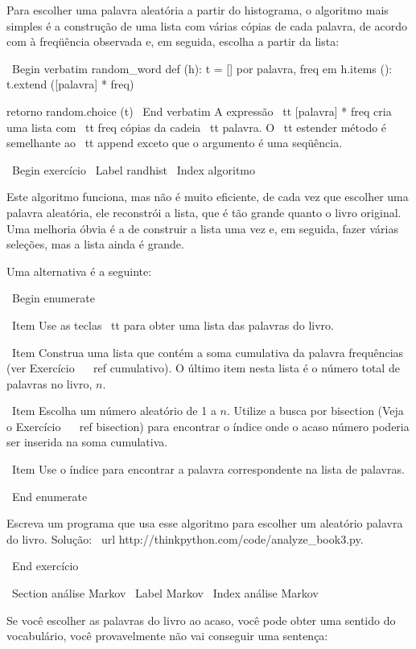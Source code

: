 \documentclass[10pt]{book}
\begin{document}
{{{{{{{{{Para escolher uma palavra aleatória a partir do histograma, o algoritmo mais simples
é a construção de uma lista com várias cópias de cada palavra, de acordo com
à freqüência observada e, em seguida, escolha a partir da lista:

\ Begin {verbatim}
random_word def (h):
    t = []
    por palavra, freq em h.items ():
        t.extend ([palavra] * freq)

    retorno random.choice (t)
\ End {verbatim}
%
A expressão {\ tt [palavra] * freq} cria uma lista com {\ tt freq}
cópias da cadeia {\ tt palavra}. O {\ tt estender}
método é semelhante ao {\ tt append} exceto que o argumento é
uma seqüência.

\ Begin {} exercício
\ Label {} randhist
\ Index {algoritmo}

Este algoritmo funciona, mas não é muito eficiente, de cada vez que
escolher uma palavra aleatória, ele reconstrói a lista, que é tão grande quanto
o livro original. Uma melhoria óbvia é a de construir a lista
uma vez e, em seguida, fazer várias seleções, mas a lista ainda é grande.

Uma alternativa é a seguinte:

\ Begin {enumerate}

\ Item Use as teclas {\ tt} para obter uma lista das palavras do livro.

\ Item Construa uma lista que contém a soma cumulativa da palavra
  frequências (ver Exercício ~ \ ref {cumulativo}). O último item
  nesta lista é o número total de palavras no livro, $ n $.
  
\ Item Escolha um número aleatório de 1 a $ n $. Utilize a busca por bisection
  (Veja o Exercício ~ \ ref {} bisection) para encontrar o índice onde o acaso
  número poderia ser inserida na soma cumulativa.

\ Item Use o índice para encontrar a palavra correspondente na lista de palavras.

\ End {enumerate}

Escreva um programa que usa esse algoritmo para escolher um aleatório
palavra do livro. Solução: \ url {http://thinkpython.com/code/analyze_book3.py}.

\ End {} exercício



\ Section {} análise Markov
\ Label {} Markov
\ Index {análise Markov}

Se você escolher as palavras do livro ao acaso, você pode obter uma
sentido do vocabulário, você provavelmente não vai conseguir uma sentença:

}}}}}}}}}
\end{document}
